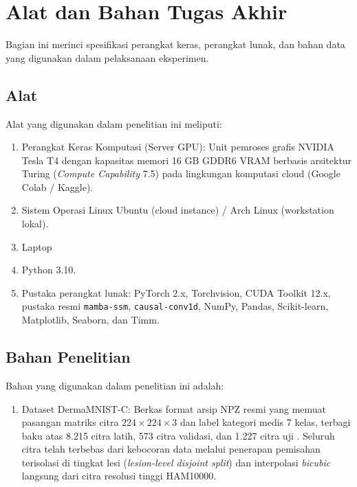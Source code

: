 \section{Alat dan Bahan Tugas Akhir} \label{III.Alat dan Bahan}
Bagian ini merinci spesifikasi perangkat keras, perangkat lunak, dan bahan data yang digunakan dalam pelaksanaan eksperimen. \par

\subsection{Alat} \label{III.Alat}
Alat yang digunakan dalam penelitian ini meliputi:
\begin{enumerate}[noitemsep]
	\item Perangkat Keras Komputasi (Server GPU): Unit pemroses grafis NVIDIA Tesla T4 dengan kapasitas memori 16 GB GDDR6 VRAM berbasis arsitektur Turing (\textit{Compute Capability} 7.5) pada lingkungan komputasi cloud (Google Colab / Kaggle).
	\item Sistem Operasi Linux Ubuntu (cloud instance) / Arch Linux (workstation lokal).
	\item Laptop
	\item Python 3.10.
	\item Pustaka perangkat lunak: PyTorch 2.x, Torchvision, CUDA Toolkit 12.x, pustaka resmi \texttt{mamba-ssm}, \texttt{causal-conv1d}, NumPy, Pandas, Scikit-learn, Matplotlib, Seaborn, dan Timm.
\end{enumerate}

\subsection{Bahan Penelitian} \label{III.Bahan}
Bahan yang digunakan dalam penelitian ini adalah:
\begin{enumerate}[noitemsep]
	\item Dataset DermaMNIST-C: Berkas format arsip NPZ resmi yang memuat pasangan matriks citra $224 \times 224 \times 3$ dan label kategori medis 7 kelas, terbagi baku atas 8.215 citra latih, 573 citra validasi, dan 1.227 citra uji \cite{abhishek2025investigating}. Seluruh citra telah terbebas dari kebocoran data melalui penerapan pemisahan terisolasi di tingkat lesi (\textit{lesion-level disjoint split}) dan interpolasi \textit{bicubic} langsung dari citra resolusi tinggi HAM10000.
\end{enumerate}

